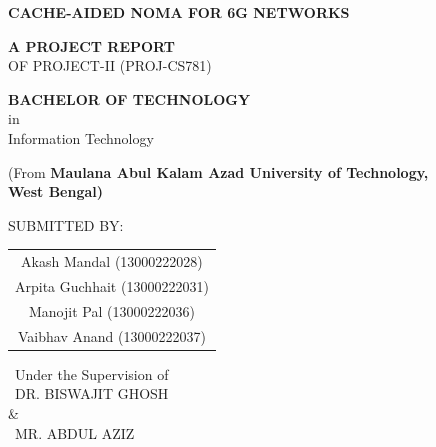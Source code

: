\documentclass[12pt,a4paper]{article}
\begin{document}
\begin{titlepage}
    \centering
    \vspace*{0.8cm}

    {\fontsize{22}{28.8}\selectfont\bfseries
    CACHE-AIDED NOMA FOR 6G NETWORKS\\[8pt]}
    
    
    \vspace{1.5cm}

    {\fontsize{14}{16.8}\selectfont\bfseries A PROJECT REPORT} \\[8pt]
    {\fontsize{12}{14.4}\selectfont OF PROJECT-II (PROJ-CS781)}
    
    \vfill %

    {\fontsize{14}{16.8}\selectfont\bfseries BACHELOR OF TECHNOLOGY}\\[4pt]
    {\fontsize{12}{14.4}\selectfont in}\\[4pt]
    {\fontsize{16}{19.2}\selectfont Information Technology}
    
    {\fontsize{12}{14.4}\selectfont (From \bfseries Maulana Abul Kalam Azad University of Technology,\\West Bengal)}
    
    \vfill

    {\fontsize{12}{14.4}\selectfont SUBMITTED BY:}\\[12pt]
    {\fontsize{14}{16.8}\selectfont %
    \begin{tabular}{c}
        Akash Mandal (13000222028) \\
        Arpita Guchhait (13000222031) \\
        Manojit Pal (13000222036) \\
        Vaibhav Anand (13000222037) \\
    \end{tabular}}
    
    \vspace{0.8cm}
    
    {\fontsize{14}{14.4}\selectfont\ Under the Supervision of}\\[8pt]
    {\fontsize{14}{16.8}\selectfont\ DR. BISWAJIT GHOSH}\\
    \&\\
    {\fontsize{14}{16.8}\selectfont\ MR. ABDUL AZIZ}
    

\end{titlepage}
\end{document}
